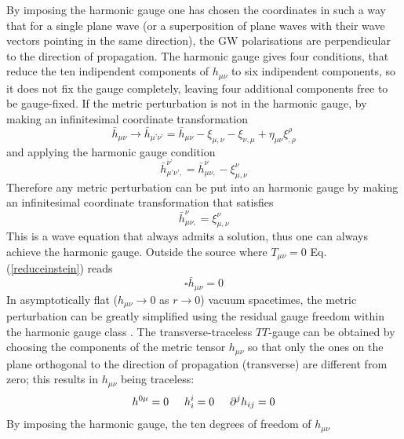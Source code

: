 \documentclass[binding=0.6cm, LaM]{sapthesis}
\begin{document}
	By imposing the harmonic gauge one has chosen the coordinates in such a way that for a single plane wave 
	(or a superposition of plane waves with their wave vectors pointing in the same direction),
	the GW polarisations are perpendicular to the direction of propagation.
	The harmonic gauge gives four conditions, that reduce the ten indipendent components of  
	$h_{\mu\nu}$ to six indipendent components, so it does not fix the gauge completely,
	leaving four additional components free to be gauge-fixed.
	If the metric perturbation is not in the harmonic gauge, by making an infinitesimal coordinate transformation
		\begin{equation}
			{\bar h}_{\mu\nu} \rightarrow {\bar h}_{\mu’\nu’}  = {\bar h}_{\mu\nu}  - \xi_{\mu,\nu} -\xi_{\nu,\mu} + \eta_{\mu\nu}\xi^{\rho}_{,\rho}
		\end{equation}
	and applying the harmonic gauge condition
		\begin{equation}
			{\bar h}_{\mu’\nu’,} ^{\nu’} = {\bar h}_{\mu\nu,} ^{\nu} - \xi_{\mu,\nu}^{\nu}
		\end{equation}
	Therefore any metric perturbation can be put into an harmonic gauge by making an infinitesimal 
	coordinate transformation that satisfies
		\begin{equation}
			{\bar h}_{\mu\nu,} ^{\nu} = \xi_{\mu,\nu}^{\nu}
		\end{equation}
	This is a wave equation that always admits a solution, thus one can always achieve the harmonic gauge. 
	Outside the source where $T_{\mu\nu} = 0$ Eq.\,(\ref{reduceinstein}) reads 
		\begin{equation}
			\square {\bar h}_{\mu\nu} = 0
		\end{equation}
	In asymptotically flat ($h_{\mu\nu} \rightarrow 0$ as $r \rightarrow 0$) vacuum spacetimes, 
	the metric perturbation can be greatly simplified using
	the residual gauge freedom within the harmonic gauge class \cite{4}. 
	The transverse-traceless $TT$-gauge can be obtained by choosing the components of the metric tensor $h_{\mu\nu}$
	so that only the ones on the plane orthogonal to the direction of propagation (transverse) 
	are different from zero; this results in $h_{\mu\nu}$ being traceless:
		\begin{equation}
			h^{0\mu} = 0 \hspace*{0.5cm}  h^{i}_i = 0  \hspace*{0.5cm}   {\partial}^jh_{ij} = 0
		\end{equation}
	By imposing the harmonic gauge, the ten degrees of freedom of $h_{\mu\nu}$ 
\end{document}
